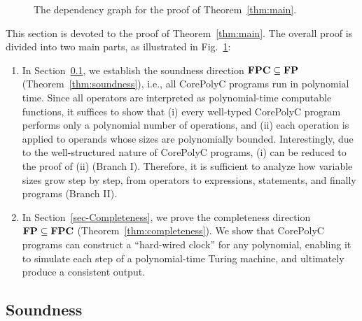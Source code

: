 \documentclass[runningheads]{llncs}
\begin{document}
\begin{figure}[t]

    \caption{The dependency graph for the proof of Theorem~\ref{thm:main}. }
    \label{fig:dependency_graph}
\end{figure}

This section is devoted to the proof of Theorem~\ref{thm:main}.
The overall proof is divided into two main parts, as illustrated in Fig.~\ref{fig:dependency_graph}:
\begin{enumerate}
    \item In Section~\ref{subsec:soundness}, we establish the soundness direction $\mathbf{FPC} \subseteq \mathbf{FP}$ (Theorem~\ref{thm:soundness}), i.e., all CorePolyC programs run in polynomial time.
   Since all operators are interpreted as polynomial-time computable functions, it suffices to show that (i) every well-typed CorePolyC program performs only a polynomial number of operations, and (ii) each operation is applied to operands whose sizes are polynomially bounded.
   Interestingly, due to the well-structured nature of CorePolyC programs, (i) can be reduced to the proof of (ii) (Branch I).
   Therefore, it is sufficient to analyze how variable sizes grow step by step, from operators to expressions, statements, and finally programs (Branch II).
   \item In Section~\ref{sec-Completeness}, we prove the completeness direction $\mathbf{FP} \subseteq \mathbf{FPC}$ (Theorem~\ref{thm:completeness}).
   We show that CorePolyC programs can construct a “hard-wired clock” for any polynomial, enabling it to simulate each step of a polynomial-time Turing machine, and ultimately produce a consistent output.
\end{enumerate}

\subsection{Soundness}\label{subsec:soundness}
\end{document}
